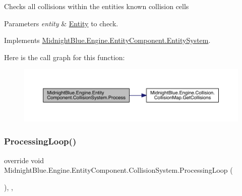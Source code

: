 Checks all collisions within the entities known collision cells 


\begin{DoxyParams}{Parameters}
{\em entity} & \hyperlink{class_midnight_blue_1_1_engine_1_1_entity_component_1_1_entity}{Entity} to check.\\
\hline
\end{DoxyParams}


Implements \hyperlink{class_midnight_blue_1_1_engine_1_1_entity_component_1_1_entity_system_a94aa715ac6bfe9a720c3d12d56c7598c}{Midnight\+Blue.\+Engine.\+Entity\+Component.\+Entity\+System}.

Here is the call graph for this function\+:
\nopagebreak
\begin{figure}[H]
\begin{center}
\leavevmode
\includegraphics[width=350pt]{class_midnight_blue_1_1_engine_1_1_entity_component_1_1_collision_system_a0fe9a2023d5fabc7861b50abfc607def_cgraph}
\end{center}
\end{figure}
\hypertarget{class_midnight_blue_1_1_engine_1_1_entity_component_1_1_collision_system_a31ce790a36d5948868df3fd352338194}{}\label{class_midnight_blue_1_1_engine_1_1_entity_component_1_1_collision_system_a31ce790a36d5948868df3fd352338194} 
\subsubsection{\texorpdfstring{Processing\+Loop()}{ProcessingLoop()}}
{\footnotesize\ttfamily override void Midnight\+Blue.\+Engine.\+Entity\+Component.\+Collision\+System.\+Processing\+Loop (\begin{DoxyParamCaption}{ }\end{DoxyParamCaption})\hspace{0.3cm}{\ttfamily [inline]}, {\ttfamily [protected]}, {\ttfamily [virtual]}}



